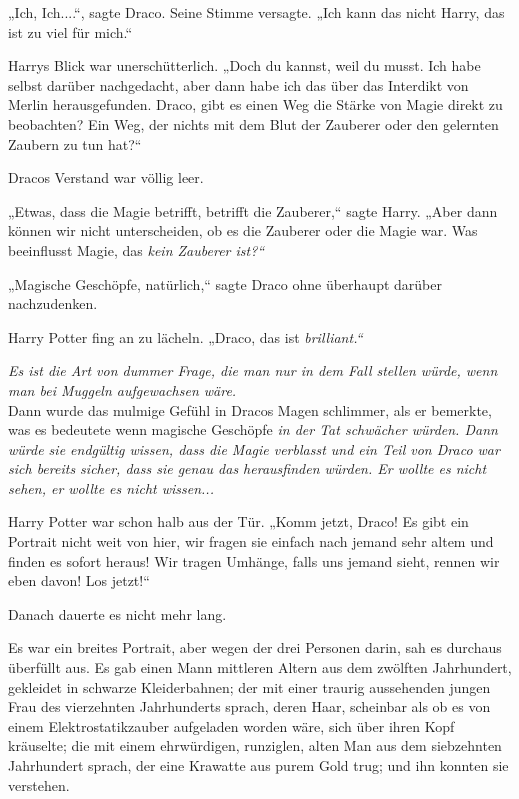 {„Ich, Ich....“, sagte Draco. Seine Stimme versagte. „Ich kann das nicht Harry, das ist zu viel für mich.“

Harrys Blick war unerschütterlich. „Doch du kannst, weil du musst. Ich habe selbst darüber nachgedacht, aber dann habe ich das über das Interdikt von Merlin herausgefunden. Draco, gibt es einen Weg die Stärke von Magie direkt zu beobachten? Ein Weg, der nichts mit dem Blut der Zauberer oder den gelernten Zaubern zu tun hat?“

Dracos Verstand war völlig leer.

„Etwas, dass die Magie betrifft, betrifft die Zauberer,“ sagte Harry. „Aber dann können wir nicht unterscheiden, ob es die Zauberer oder die Magie war. Was beeinflusst Magie, das \emph{kein Zauberer ist?“}

„Magische Geschöpfe, natürlich,“ sagte Draco ohne überhaupt darüber nachzudenken.

Harry Potter fing an zu lächeln. „Draco, das ist \emph{brilliant.“}

\emph{Es ist die Art von dummer Frage, die man nur in dem Fall stellen würde, wenn man bei Muggeln aufgewachsen wäre.}\\ Dann wurde das mulmige Gefühl in Dracos Magen schlimmer, als er bemerkte, was es bedeutete wenn magische Geschöpfe \emph{in der Tat schwächer würden. Dann würde sie endgültig wissen, dass die Magie verblasst und ein Teil von Draco war sich bereits sicher, dass sie genau das herausfinden würden. Er wollte es nicht sehen, er wollte es nicht \emph{wissen}...}

Harry Potter war schon halb aus der Tür. „Komm jetzt, Draco! Es gibt ein Portrait nicht weit von hier, wir fragen sie einfach nach jemand sehr altem und finden es sofort heraus! Wir tragen Umhänge, falls uns jemand sieht, rennen wir eben davon! Los jetzt!“

Danach dauerte es nicht mehr lang.

Es war ein breites Portrait, aber wegen der drei Personen darin, sah es durchaus überfüllt aus. Es gab einen Mann mittleren Altern aus dem zwölften Jahrhundert, gekleidet in schwarze Kleiderbahnen; der mit einer traurig aussehenden jungen Frau des vierzehnten Jahrhunderts sprach, deren Haar, scheinbar als ob es von einem Elektrostatikzauber aufgeladen worden wäre, sich über ihren Kopf kräuselte; die mit einem ehrwürdigen, runziglen, alten Man aus dem siebzehnten Jahrhundert sprach, der eine Krawatte aus purem Gold trug; und ihn konnten sie verstehen.

}
